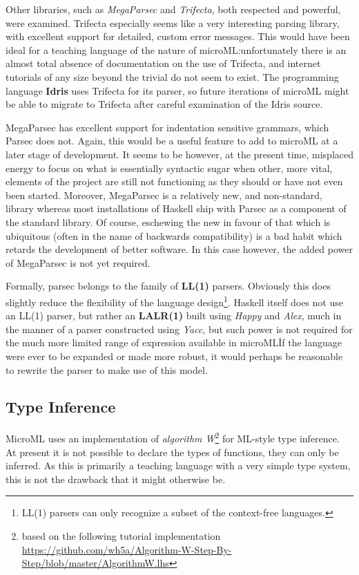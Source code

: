 \documentclass[12pt, a4paper]{report}
\begin{document}
Other libraries, such as \textit{MegaParsec} and \textit{Trifecta}, both respected and powerful,
were examined. Trifecta especially seems like a very interesting parsing library, with excellent
support for detailed, custom error messages. This would have been ideal for a teaching language
of the nature of microML:\@ unfortunately there is an almost total absence of documentation on the
use of Trifecta, and internet tutorials of any size beyond the trivial do not seem to exist. The
programming language \textbf{Idris} uses Trifecta for its parser, so future iterations of microML
might be able to migrate to Trifecta after careful examination of the Idris source.

MegaParsec has excellent support for indentation sensitive grammars, which Parsec does not.
Again, this would be a useful feature to add to microML at a later stage of development. It seems
to be however, at the present time, misplaced energy to focus on what is essentially syntactic
sugar when other, more vital, elements of the project are still not functioning as they should or
have not even been started. Moreover, MegaParsec is a relatively new, and non-standard, library
whereas most installations of Haskell ship with Parsec as a component of the standard library. Of
course, eschewing the new in favour of that which is ubiquitous (often in the name of backwards
compatibility) is a bad habit which retards the development of better software. In this case
however, the added power of MegaParsec is not yet required.

Formally, parsec belongs to the family of \textbf{LL(1)} parsers. Obviously this does slightly
reduce the flexibility of the language design\footnote{LL(1) parsers can only recognize a subset
of the context-free languages.}. Haskell itself does not use an LL(1) parser, but rather an
\textbf{LALR(1)} built using \textit{Happy} and \textit{Alex}, much in the manner of a parser
constructed using \textit{Yacc}, but such power is not required for the much more limited range of
expression available in microML\. If the language were ever to be expanded or made more robust, it
would perhaps be reasonable to rewrite the parser to make use of this model.

\subsection{Type Inference}
\label{sec:type}
MicroML uses an implementation of \textit{algorithm W}\footnote{based on the following tutorial
implementation \url{https://github.com/wh5a/Algorithm-W-Step-By-Step/blob/master/AlgorithmW.lhs}}
for ML-style type inference. At present it is not possible to declare the types of functions, they
can only be inferred. As this is primarily a teaching language with a very simple type system, this
is not the drawback that it might otherwise be.
\end{document}
